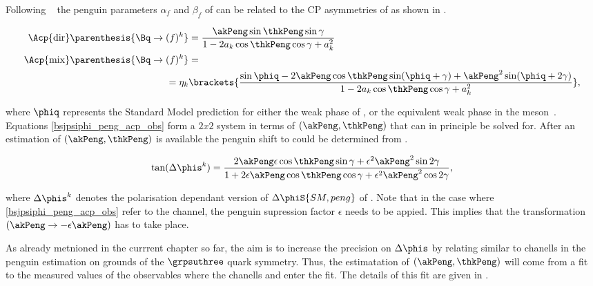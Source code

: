 Following ~\cite{Faller:2008gt} the penguin parameters $\alpha_f$ and $\beta_f$ of 
can be related to the CP asymmetries of  as shown in .

\begin{subequations}
  \label{bsjpsiphi_peng_acp_obs}
\begin{align}
  \Acp{\rm dir}\parenthesis{\Bq\to (f)^k} &= \frac{ \akPeng \sin\thkPeng \sin\gamma} {1 - 2 a_k \cos\thkPeng \cos\gamma + a_k^{2}}
  \label{bsjpsiphi_peng_acp_dir} \\
  \Acp{\rm mix}\parenthesis{\Bq\to (f)^k} &= \nonumber \\
   = \eta_k & \brackets{\frac{\sin\phiq - 2\akPeng \cos\thkPeng\sin(\phiq+\gamma) + \akPeng^2 \sin(\phiq+2\gamma)}
                                                                 {1 - 2 a_k \cos\thkPeng \cos\gamma + a_k^{2}} },
  \label{bsjpsiphi_peng_acp_mix}
\end{align}
\end{subequations}

\noindent where $\phiq$ represents the Standard Model prediction for either the weak phase \phis of ,
or the equivalent weak phase \phid in the \Bd meson~\cite{PDG}. Equations \ref{bsjpsiphi_peng_acp_obs} form a $2x2$ system in
terms of $(\akPeng,\thkPeng)$ that can in principle be solved for. After an estimation of $(\akPeng,\thkPeng)$ is available the
penguin shift to \phis could be determined from .

\begin{equation}
\centering
\tan(\Delta\phis^k) = \frac{ 2\akPeng\epsilon\cos\thkPeng \sin\gamma + \epsilon^2\akPeng^2 \sin2\gamma}
                             {1 + 2\epsilon\akPeng \cos\thkPeng \cos\gamma + \epsilon^2\akPeng^2 \cos2\gamma},
\label{tandelta}
\end{equation}

\noindent where $\Delta\phis^k$ denotes the polarisation dependant version of $\Delta\phiS{SM, peng}$ of .
Note that in the case where \eqref{bsjpsiphi_peng_acp_obs} refer to the \BsJpsiPhi channel, the penguin supression factor
$\epsilon$ needs to be appied. This implies that the transformation $(\akPeng\to-\epsilon\akPeng)$ has to take place.

As already metnioned in the currrent chapter so far, the aim is to increase the precision on $\Delta{\phis}$
by relating similar to \BsJpsiPhi chanells in the penguin estimation on grounds of the $\grpsuthree$ quark symmetry.
Thus, the estimatation of $(\akPeng,\thkPeng)$ will come from a \chisq fit to the measured values of the observables
 where the chanells \BsJpsiKst and \BdJpsiRho enter the fit.
The details of this fit are given in .

